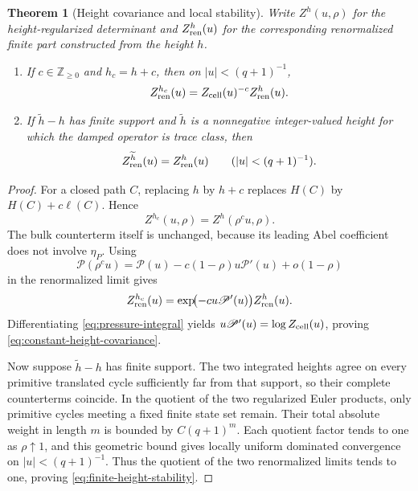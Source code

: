 \documentclass[11pt,reqno]{amsart}
\numberwithin{equation}{section}
\newtheorem{theorem}{Theorem}[section]
\theoremstyle{definition}
\theoremstyle{remark}
\begin{document}
\begin{theorem}[Height covariance and local stability]
\label{thm:height-covariance}
Write $Z^{h}(u,\rho)$ for the height-regularized determinant and
$Z_{\rm ren}^{h}(u)$ for the corresponding renormalized finite part constructed
from the height $h$.
\begin{enumerate}[label=(\roman*)]
\item If $c\in\mathbb Z_{\ge0}$ and $h_c=h+c$, then on
$|u|<(q+1)^{-1}$,
\begin{equation}\label{eq:constant-height-covariance}
 Z_{\rm ren}^{h_c}(u)
 =Z_{\rm cell}(u)^{-c}Z_{\rm ren}^{h}(u).
\end{equation}
\item If $\widetilde h-h$ has finite support and $\widetilde h$ is a
nonnegative integer-valued height for which the damped operator is trace
class, then
\begin{equation}\label{eq:finite-height-stability}
 Z_{\rm ren}^{\widetilde h}(u)=Z_{\rm ren}^{h}(u)
 \qquad(|u|<(q+1)^{-1}).
\end{equation}
\end{enumerate}
\end{theorem}

\begin{proof}
For a closed path $C$, replacing $h$ by $h+c$ replaces $H(C)$ by
$H(C)+c\ell(C)$.  Hence
\begin{equation}\label{eq:shifted-regularized-zeta}
 Z^{h_c}(u,\rho)=Z^h(\rho^c u,\rho).
\end{equation}
The bulk counterterm itself is unchanged, because its leading Abel coefficient
does not involve $\eta_P$.  Using
\[
 \mathscr P(\rho^c u)
 =\mathscr P(u)-c(1-\rho)u\mathscr P'(u)+o(1-\rho)
\]
in the renormalized limit gives
\[
 Z_{\rm ren}^{h_c}(u)
 =\exp\!\bigl(-cu\mathscr P'(u)\bigr)Z_{\rm ren}^{h}(u).
\]
Differentiating \eqref{eq:pressure-integral} yields
$u\mathscr P'(u)=\log Z_{\rm cell}(u)$, proving
\eqref{eq:constant-height-covariance}.

Now suppose $\widetilde h-h$ has finite support.  The two integrated heights
agree on every primitive translated cycle sufficiently far from that support,
so their complete counterterms coincide.  In the quotient of the two
regularized Euler products, only primitive cycles meeting a fixed finite state
set remain.  Their total absolute weight in length $m$ is bounded by
$C(q+1)^m$.  Each quotient factor tends to one as $\rho\uparrow1$, and this
geometric bound gives locally uniform dominated convergence on
$|u|<(q+1)^{-1}$.  Thus the quotient of the two renormalized limits tends to
one, proving \eqref{eq:finite-height-stability}.
\end{proof}
\end{document}
